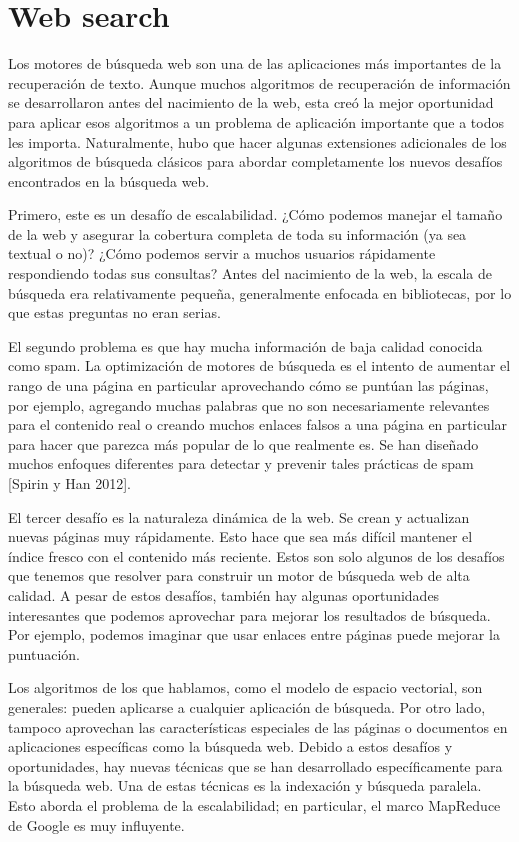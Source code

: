 \chapter{Web search}\label{Chapter7} 

Los motores de búsqueda web son una de las aplicaciones más importantes de la recuperación de texto. Aunque muchos algoritmos de recuperación de información se desarrollaron antes del nacimiento de la web, esta creó la mejor oportunidad para aplicar esos algoritmos a un problema de aplicación importante que a todos les importa. Naturalmente, hubo que hacer algunas extensiones adicionales de los algoritmos de búsqueda clásicos para abordar completamente los nuevos desafíos encontrados en la búsqueda web.

Primero, este es un desafío de escalabilidad. ¿Cómo podemos manejar el tamaño de la web y asegurar la cobertura completa de toda su información (ya sea textual o no)? ¿Cómo podemos servir a muchos usuarios rápidamente respondiendo todas sus consultas? Antes del nacimiento de la web, la escala de búsqueda era relativamente pequeña, generalmente enfocada en bibliotecas, por lo que estas preguntas no eran serias.

El segundo problema es que hay mucha información de baja calidad conocida como spam. La optimización de motores de búsqueda es el intento de aumentar el rango de una página en particular aprovechando cómo se puntúan las páginas, por ejemplo, agregando muchas palabras que no son necesariamente relevantes para el contenido real o creando muchos enlaces falsos a una página en particular para hacer que parezca más popular de lo que realmente es. Se han diseñado muchos enfoques diferentes para detectar y prevenir tales prácticas de spam [Spirin y Han 2012].

El tercer desafío es la naturaleza dinámica de la web. Se crean y actualizan nuevas páginas muy rápidamente. Esto hace que sea más difícil mantener el índice fresco con el contenido más reciente. Estos son solo algunos de los desafíos que tenemos que resolver para construir un motor de búsqueda web de alta calidad. A pesar de estos desafíos, también hay algunas oportunidades interesantes que podemos aprovechar para mejorar los resultados de búsqueda. Por ejemplo, podemos imaginar que usar enlaces entre páginas puede mejorar la puntuación.

Los algoritmos de los que hablamos, como el modelo de espacio vectorial, son generales: pueden aplicarse a cualquier aplicación de búsqueda. Por otro lado, tampoco aprovechan las características especiales de las páginas o documentos en aplicaciones específicas como la búsqueda web. Debido a estos desafíos y oportunidades, hay nuevas técnicas que se han desarrollado específicamente para la búsqueda web. Una de estas técnicas es la indexación y búsqueda paralela. Esto aborda el problema de la escalabilidad; en particular, el marco MapReduce de Google es muy influyente.

